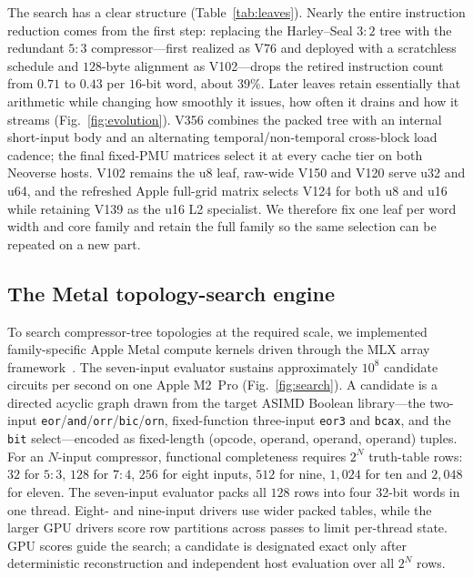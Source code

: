 \documentclass[fleqn,10pt]{wlscirep}
\begin{document}
The search has a clear structure (Table~\ref{tab:leaves}). Nearly the entire instruction reduction comes from the first step: replacing the Harley--Seal $3{:}2$ tree with the redundant $5{:}3$ compressor---first realized as V76 and deployed with a scratchless schedule and $128$-byte alignment as V102---drops the retired instruction count from $0.71$ to $0.43$ per $16$-bit word, about $39\%$. Later leaves retain essentially that arithmetic while changing how smoothly it issues, how often it drains and how it streams (Fig.~\ref{fig:evolution}). V356 combines the packed tree with an internal short-input body and an alternating temporal/non-temporal cross-block load cadence; the final fixed-PMU matrices select it at every cache tier on both Neoverse hosts. V102 remains the u8 leaf, raw-wide V150 and V120 serve u32 and u64, and the refreshed Apple full-grid matrix selects V124 for both u8 and u16 while retaining V139 as the u16 L2 specialist. We therefore fix one leaf per word width and core family and retain the full family so the same selection can be repeated on a new part.


\subsection*{The Metal topology-search engine}
To search compressor-tree topologies at the required scale, we implemented family-specific Apple Metal compute kernels driven through the MLX array framework~\cite{mlx2023}. The seven-input evaluator sustains approximately $10^{8}$ candidate circuits per second on one Apple M2~Pro (Fig.~\ref{fig:search}). A candidate is a directed acyclic graph drawn from the target ASIMD Boolean library---the two-input \texttt{eor}/\texttt{and}/\texttt{orr}/\texttt{bic}/\texttt{orn}, fixed-function three-input \texttt{eor3} and \texttt{bcax}, and the \texttt{bit} select---encoded as fixed-length (opcode, operand, operand, operand) tuples. For an $N$-input compressor, functional completeness requires $2^N$ truth-table rows: $32$ for $5{:}3$, $128$ for $7{:}4$, $256$ for eight inputs, $512$ for nine, $1{,}024$ for ten and $2{,}048$ for eleven. The seven-input evaluator packs all $128$ rows into four 32-bit words in one thread. Eight- and nine-input drivers use wider packed tables, while the larger GPU drivers score row partitions across passes to limit per-thread state. GPU scores guide the search; a candidate is designated exact only after deterministic reconstruction and independent host evaluation over all $2^N$ rows.
\end{document}
